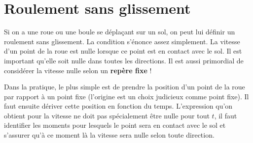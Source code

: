 \documentclass[11pt,a4paper]{article}
\begin{document}
\section{Roulement sans glissement}

Si on a une roue ou une boule se déplaçant sur un sol, on peut lui définir un roulement sans glissement.
La condition s'énonce assez simplement.
La vitesse d'un point de la roue est nulle lorsque ce point est en contact avec le sol.
Il est important qu'elle soit nulle dans toutes les directions.
Il est aussi primordial de considérer la vitesse nulle selon un {\bf repère fixe} !

Dans la pratique, le plus simple est de prendre la position d'un point de la roue par rapport à un point fixe (l'origine est un choix judicieux comme point fixe).
Il faut ensuite dériver cette position en fonction du temps.
L'expression qu'on obtient pour la vitesse ne doit pas spécialement être nulle pour tout $t$, il faut identifier les moments pour lesquels le point sera en contact avec le sol et s'assurer qu'à ce moment là la vitesse sera nulle selon toute direction.
\end{document}
